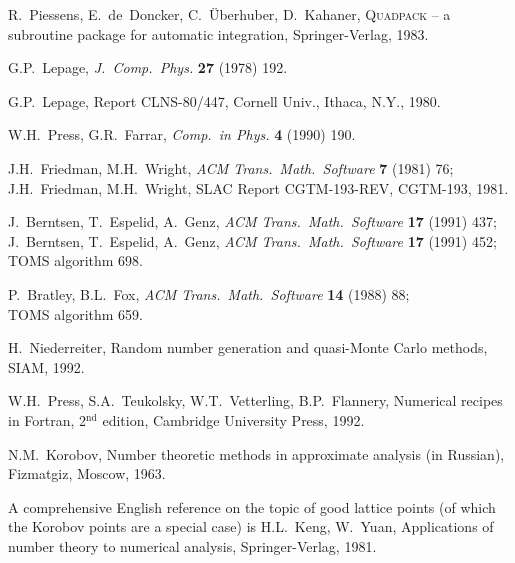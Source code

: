 \documentclass[12pt]{article}
\begin{document}

\begin{thebibliography}{99}

\newcommand{\volyearpage}[3]{\textbf{#1} (#2) #3}
\newcommand{\cpc}{\textsl{Comp.\ Phys.\ Commun.} \volyearpage}
\newcommand{\jpc}{\textsl{J.\ Comp.\ Phys.} \volyearpage}
\newcommand{\cip}{\textsl{Comp.\ in Phys.} \volyearpage}
\newcommand{\toms}{\textsl{ACM Trans.\ Math.\ Software} \volyearpage}
\newcommand{\tomacs}{\textsl{ACM Trans.\ Modeling Comp.\ Simulation} \volyearpage}
\newcommand{\siam}{\textsl{SIAM J.\ Numer.\ Anal.} \volyearpage}
\newcommand{\numa}{\textsl{Numer.\ Math.} \volyearpage}

R.~Piessens, E.~de~Doncker, C.~\"Uberhuber, D.~Kahaner,
\textsc{Quadpack} -- a subroutine package for automatic integration,
Springer-Verlag, 1983.

G.P.~Lepage, \jpc{27}{1978}{192}.

G.P.~Lepage, Report CLNS-80/447, Cornell Univ., Ithaca, N.Y., 1980.

W.H.~Press, G.R.~Farrar, \cip{4}{1990}{190}.

J.H.~Friedman, M.H.~Wright, \toms{7}{1981}{76}; \\
J.H.~Friedman, M.H.~Wright, SLAC Report CGTM-193-REV, CGTM-193, 1981.

J.~Berntsen, T.~Espelid, A.~Genz, \toms{17}{1991}{437}; \\
J.~Berntsen, T.~Espelid, A.~Genz, \toms{17}{1991}{452}; \\
TOMS algorithm 698.

P.~Bratley, B.L.~Fox, \toms{14}{1988}{88}; \\
TOMS algorithm 659.

H.~Niederreiter, Random number generation and quasi-Monte Carlo methods,
SIAM, 1992.

W.H.~Press, S.A.~Teukolsky, W.T.~Vetterling, B.P.~Flannery, Numerical 
recipes in Fortran, 2$^{\text{nd}}$ edition, Cambridge University Press, 
1992.

N.M.~Korobov, Number theoretic methods in approximate analysis
(in Russian), Fizmatgiz, Moscow, 1963.

A comprehensive English reference on the topic of good lattice points
(of which the Korobov points are a special case) is H.L.~Keng, W.~Yuan,
Applications of number theory to numerical analysis, Springer-Verlag,
1981.


\end{thebibliography}
\end{document}
